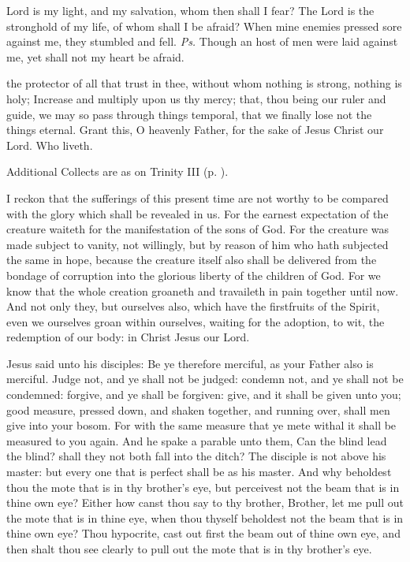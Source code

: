 \introit
{} Lord is my light, and my salvation, whom then shall I fear? The Lord is the stronghold of my life, of whom shall I be afraid? When mine enemies pressed sore against me, they stumbled and fell. \textit{Ps.} Though an host of men were laid against me, yet shall not my heart be afraid.

\collect
{} the protector of all that trust in thee, without whom nothing is strong, nothing is holy; Increase and multiply upon us thy mercy; that, thou being our ruler and guide, we may so pass through things temporal, that we finally lose not the things eternal. Grant this, O heavenly Father, for the sake of Jesus Christ our Lord. Who liveth.
\begin{rubric}
    Additional Collects are as on Trinity III (p. \pageref{TrinityIII}).
\end{rubric}
 I reckon that the sufferings of this present time are not worthy to be compared with the glory which shall be revealed in us. For the earnest expectation of the creature waiteth for the manifestation of the sons of God. For the creature was made subject to vanity, not willingly, but by reason of him who hath subjected the same in hope, because the creature itself also shall be delivered from the bondage of corruption into the glorious liberty of the children of God. For we know that the whole creation groaneth and travaileth in pain together until now. And not only they, but ourselves also, which have the firstfruits of the Spirit, even we ourselves groan within ourselves, waiting for the adoption, to wit, the redemption of our body: in Christ Jesus our Lord.


 Jesus said unto his disciples: Be ye therefore merciful, as your Father also is merciful. Judge not, and ye shall not be judged: condemn not, and ye shall not be condemned: forgive, and ye shall be forgiven: give, and it shall be given unto you; good measure, pressed down, and shaken together, and running over, shall men give into your bosom. For with the same measure that ye mete withal it shall be measured to you again. And he spake a parable unto them, Can the blind lead the blind? shall they not both fall into the ditch? The disciple is not above his master: but every one that is perfect shall be as his master. And why beholdest thou the mote that is in thy brother's eye, but perceivest not the beam that is in thine own eye? Either how canst thou say to thy brother, Brother, let me pull out the mote that is in thine eye, when thou thyself beholdest not the beam that is in thine own eye? Thou hypocrite, cast out first the beam out of thine own eye, and then shalt thou see clearly to pull out the mote that is in thy brother's eye.

